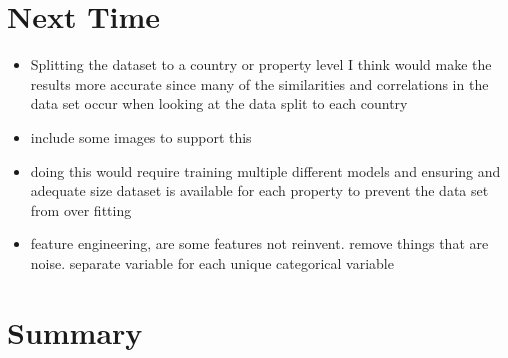 \section{Next Time}
\begin{itemize}
\item Splitting the dataset to a country or property level I think would make the results more accurate since many of the similarities and correlations in the data set occur when looking at the data split to each country
\item include some images to support this 
\item doing this would require training multiple different models and ensuring and adequate size dataset is available for each property to prevent the data set from over fitting
\item  feature engineering, are some features not reinvent. remove things that are noise. separate variable for each unique categorical variable 
\end{itemize}




\section{Summary}